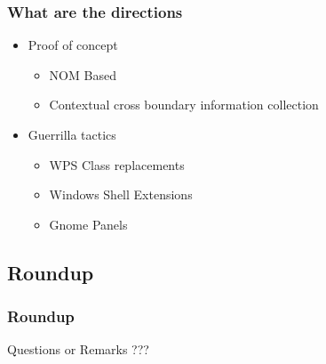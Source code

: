 \documentclass{beamer}
\begin{document}
\begin{frame}
\frametitle{What are the directions}

\begin{itemize}
  \item Proof of concept
  \begin{itemize}
  	\item NOM Based
  	\item Contextual cross boundary information collection
  \end{itemize} 
  \item Guerrilla tactics
  \begin{itemize}
  	\item WPS Class replacements
  	\item Windows Shell Extensions
  	\item Gnome Panels 
  \end{itemize} 
\end{itemize}
\end{frame}

\subsection[Roundup]{Roundup}

\begin{frame}
\frametitle{Roundup}

Questions or Remarks ??? 
\end{frame}
\end{document}
